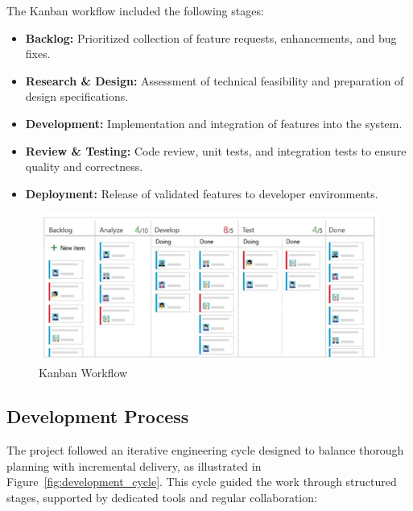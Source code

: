 \begin{spacing}{1.2}
The Kanban workflow included the following stages:

\begin{itemize}
    \item \textbf{Backlog:} Prioritized collection of feature requests, enhancements, and bug fixes.
    \item \textbf{Research \& Design:} Assessment of technical feasibility and preparation of design specifications.
    \item \textbf{Development:} Implementation and integration of features into the system.
    \item \textbf{Review \& Testing:} Code review, unit tests, and integration tests to ensure quality and correctness.
    \item \textbf{Deployment:} Release of validated features to developer environments.
\end{itemize}

\begin{figure}[H]
    \centering
    \includegraphics[scale=0.65]{Images/kanban_workflow.jpg}
    \caption{Kanban Workflow}
    \label{fig:kanban_workflow}
\end{figure}


\subsection{Development Process}
The project followed an iterative engineering cycle designed to balance thorough planning with incremental delivery, as illustrated in Figure~\ref{fig:development_cycle}. This cycle guided the work through structured stages, supported by dedicated tools and regular collaboration:


\end{spacing}
